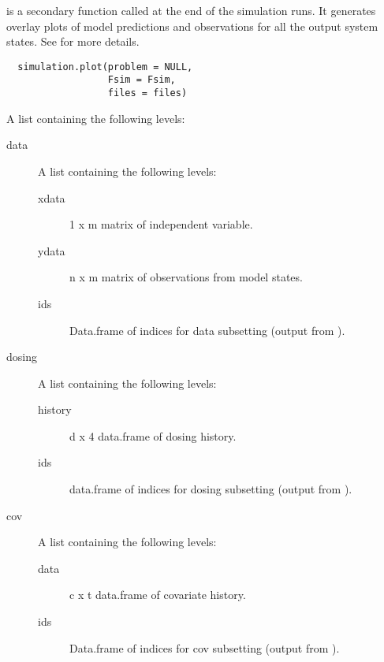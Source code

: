 %
\begin{Description}\relax
{} is a secondary function called at the end of the 
simulation runs. It generates overlay plots of model predictions and
observations for all the output system states. See
 for more details.
\end{Description}
%
\begin{Usage}
\begin{verbatim}
  simulation.plot(problem = NULL,
                  Fsim = Fsim,
                  files = files)
\end{verbatim}
\end{Usage}
%
\begin{Arguments}
\begin{ldescription}
\item[\code{problem}] A list containing the following levels:\begin{description}

\item[data] A list containing the following levels:\begin{description}

\item[xdata] 1 x m matrix of independent variable.
\item[ydata] n x m matrix of observations from model states.
\item[ids] Data.frame of indices for data subsetting (output
from ).

\end{description}

\item[dosing] A list containing the following levels:\begin{description}

\item[history] d x 4 data.frame of dosing history.
\item[ids] data.frame of indices for dosing subsetting
(output from ).

\end{description}

\item[cov] A list containing the following levels:\begin{description}

\item[data] c x t data.frame of covariate history.
\item[ids] Data.frame of indices for cov subsetting (output
from ).


\end{description}
\end{description}
\end{ldescription}
\end{Arguments}
